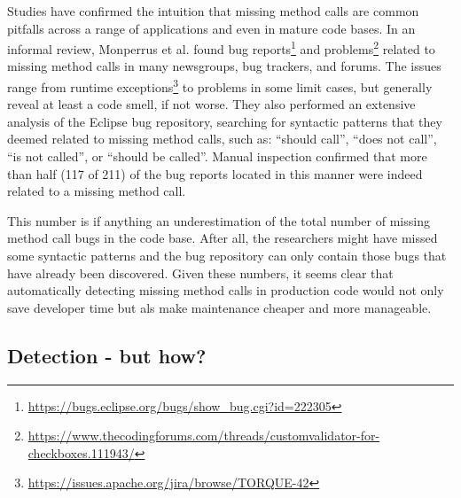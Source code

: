 Studies have confirmed the intuition that missing method calls are common pitfalls across a range of applications and even in mature code bases.
In an informal review, Monperrus et al. found bug reports\footnote{\url{https://bugs.eclipse.org/bugs/show_bug.cgi?id=222305}} and problems\footnote{\url{https://www.thecodingforums.com/threads/customvalidator-for-checkboxes.111943/}} related to missing method calls in many newsgroups, bug trackers, and forums.
The issues range from runtime exceptions\footnote{\url{https://issues.apache.org/jira/browse/TORQUE-42}} to problems in some limit cases, but generally reveal at least a code smell, if not worse.
They also performed an extensive analysis\cite{monperrus2013detecting} of the Eclipse bug repository,
searching for syntactic patterns that they deemed related to missing method calls, such as: ``should call'', ``does not call'', ``is not called'', or ``should be called''.
Manual inspection confirmed that more than half (117 of 211) of the bug reports located in this manner were indeed related to a missing method call.

This number is if anything an underestimation of the total number of missing method call bugs in the code base.
After all, the researchers might have missed some syntactic patterns and the bug repository can only contain those bugs that have already been discovered.
Given these numbers, it seems clear that automatically detecting missing method calls in production code would not only save developer time but als make maintenance cheaper and more manageable.

\subsection{Detection - but how?}

